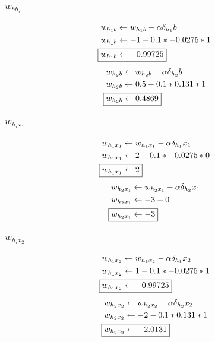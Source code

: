 \documentclass[12pt,letterpaper]{article}
\begin{document}
\subsubsection*{$w_{bh_i}$}
\begin{align*}
w_{h_1b} &\leftarrow w_{h_1b} - \alpha\delta_{h_1}b\\
w_{h_1b} &\leftarrow -1 - 0.1*-0.0275*1\\
\Aboxed{w_{h_1b} &\leftarrow -0.99725}
\end{align*}
\begin{align*}
w_{h_2b} &\leftarrow w_{h_2b} - \alpha\delta_{h_2}b\\
w_{h_2b} &\leftarrow 0.5 - 0.1*0.131*1\\
\Aboxed{w_{h_2b} &\leftarrow 0.4869}
\end{align*}
\subsubsection*{$w_{h_i x_1}$}
\begin{align*}
w_{h_1x_1} &\leftarrow w_{h_1x_1} - \alpha\delta_{h_1}x_1\\
w_{h_1x_1} &\leftarrow 2 - 0.1*-0.0275*0\\
\Aboxed{w_{h_1x_1} &\leftarrow 2}
\end{align*}
\begin{align*}
w_{h_2x_1} &\leftarrow w_{h_2x_1} - \alpha\delta_{h_2}x_1\\
w_{h_2x_1} &\leftarrow -3 - 0\\
\Aboxed{w_{h_2x_1} &\leftarrow -3}
\end{align*}
\subsubsection*{$w_{h_i x_2}$}
\begin{align*}
w_{h_1x_2} &\leftarrow w_{h_1x_2} - \alpha\delta_{h_1}x_2\\
w_{h_1x_2} &\leftarrow 1 - 0.1*-0.0275*1\\
\Aboxed{w_{h_1x_2} &\leftarrow -0.99725}
\end{align*}
\begin{align*}
w_{h_2x_2} &\leftarrow w_{h_2x_2} - \alpha\delta_{h_2}x_2\\
w_{h_2x_2} &\leftarrow -2 - 0.1*0.131*1\\
\Aboxed{w_{h_2x_2} &\leftarrow -2.0131}
\end{align*}
\end{document}
